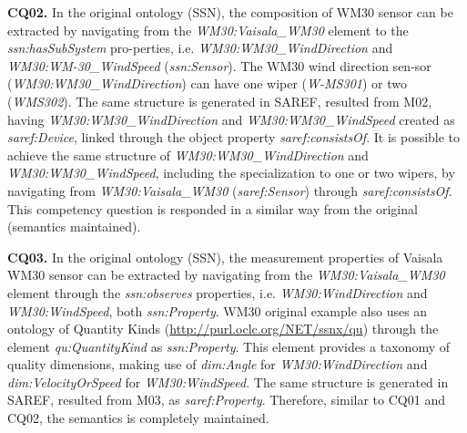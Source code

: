 \documentclass{sig-alternate-05-2015}
\begin{document}
\noindent
\textbf{CQ02.} In the original ontology (SSN), the composition of WM30 sensor can be extracted by navigating from the \textit{WM30:\-Vaisala\-\_WM30} element to the \textit{ssn:\-hasSubSystem} pro-perties, i.e. \textit{WM30:\-WM30\-\_Wind\-Direction} and \textit{WM30:\-WM-30\-\_WindSpeed} (\textit{ssn:\-Sensor}). The WM30 wind direction sen-sor (\textit{WM30:\-WM30\-\_Wind\-Direction}) can have one wiper (\textit{W-MS301}) or two (\textit{WMS302}). The same structure is generated in SAREF, resulted from M02, having \textit{WM30:\-WM30\-\_Wind\-Direction} and \textit{WM30:\-WM30\-\_WindSpeed} created as \textit{saref:\-Device}, linked through the object property \textit{saref:\-consistsOf}. It is possible to achieve the same structure of \textit{WM30:\-WM30\-\_Wind\-Direction} and \textit{WM30:\-WM30\-\_WindSpeed}, including the specialization to one or two wipers, by navigating from \textit{WM30:\-Vaisala\-\_WM30} (\textit{saref:\-Sensor}) through \textit{saref:\-consistsOf}. This competency question is responded in a similar way from the original (semantics maintained).

\noindent
\textbf{CQ03.} In the original ontology (SSN), the measurement properties of Vaisala WM30 sensor can be extracted by navigating from the \textit{WM30:\-Vaisala\-\_WM30} element through the \textit{ssn:\-observes} properties, i.e. \textit{WM30:\-WindDirection} and \textit{WM30:\-WindSpeed}, both \textit{ssn:\-Property}. WM30 original example also uses an ontology of Quantity Kinds (\url{http://purl.oclc.org/NET/ssnx/qu}) through the element \textit{qu:QuantityKind} as \textit{ssn:\-Property}. This element provides a taxonomy of quality dimensions, making use of \textit{dim:Angle} for \textit{WM30:\-WindDirection} and \textit{dim:VelocityOrSpeed} for \textit{WM30:\-WindSpeed}. The same structure is generated in SAREF, resulted from M03, as \textit{saref:\-Property}. Therefore, similar to CQ01 and CQ02, the semantics is completely maintained.
\end{document}

